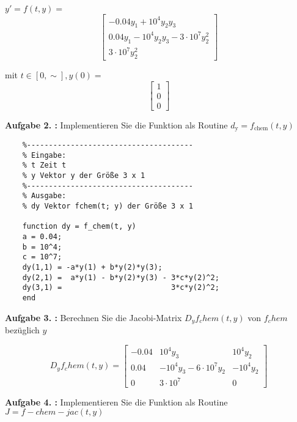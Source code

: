 $y' = f(t,y) = $
\begin{equation}
\begin{bmatrix}
	-0.04y_1 + 10^4y_2y_3 \\
	0.04y_1-10^4y_2y_3-3\cdot 10^7y^2_2 \\
	3 \cdot 10^7y^2_2 
\end{bmatrix}  
\end{equation}


mit $ t\in [0,\sim], y(0) = $ 
\begin{equation}
\begin{bmatrix}
	1 \\
	0 \\
	0
\end{bmatrix}
\end{equation}
\begin{mybox}
	\textbf{Aufgabe 2. :}  Implementieren Sie die Funktion als Routine $ d_\mathrm{y} = f_{\mathrm{chem}}(t,y) $
\end{mybox}



\begin{lstlisting}[style=Matlab-editor]
	% dy=f_chem(t,y)
	%--------------------------------------
	% Eingabe:
	% t Zeit t
	% y Vektor y der Größe 3 x 1
	%--------------------------------------
	% Ausgabe:
	% dy Vektor fchem(t; y) der Größe 3 x 1

	function dy = f_chem(t, y)
	a = 0.04;
	b = 10^4;
	c = 10^7;
	dy(1,1) = -a*y(1) + b*y(2)*y(3);
	dy(2,1) =  a*y(1) - b*y(2)*y(3) - 3*c*y(2)^2;
	dy(3,1) =                         3*c*y(2)^2;
	end
\end{lstlisting}


\begin{mybox}
	\textbf{Aufgabe 3. :}	Berechnen Sie die Jacobi-Matrix $ D_yf_chem(t,y) $ von $ f_chem $ bezüglich $ y $
\end{mybox} 

\begin{equation}
	D_yf_chem(t,y) =
\begin{bmatrix}
	-0.04 & 10^4y_3 & 10^4y_2 \\
	0.04 & -10^4y_3-6\cdot 10^7y_2 & -10^4y_2 \\
	0 & 3\cdot 10^7 & 0 
\end{bmatrix}
\end{equation}

\begin{mybox}
	\textbf{Aufgabe 4. :}	Implementieren Sie die Funktion als Routine $ J = f-chem-jac(t,y) $
\end{mybox}
 
